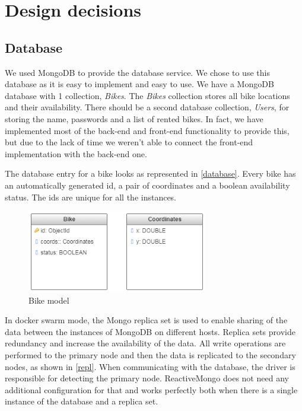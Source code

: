 \section{Design decisions}

\subsection{Database} \label{db_disc}
We used MongoDB to provide the database service. We chose to use this database as it is easy to implement and easy to use. We have a MongoDB database with 1 collection, \textit{Bikes}. The \textit{Bikes} collection stores all bike locations and their availability. There should be a second database collection, \textit{Users}, for storing the name, passwords and a list of rented bikes. In fact, we have implemented most of the back-end and front-end functionality to provide this, but due to the lack of time we weren't able to connect the front-end implementation with the back-end one.

The database entry for a bike looks as represented in \autoref{database}. Every bike has an automatically generated id, a pair of coordinates and a boolean availability status. The ids are unique for all the instances.

    \begin{figure}[H]
		\centering
		\includegraphics[width=0.7\textwidth]{images/db-structure.png}
		\caption{Bike model}
		\label{database}
	\end{figure}


In docker swarm mode, the Mongo replica set is used to enable sharing of the data between the instances of MongoDB on different hosts. Replica sets provide redundancy and increase the availability of the data. All write operations are performed to the primary node and then the data is replicated to the secondary nodes, as shown in \autoref{repl}. When communicating with the database, the driver is responsible for detecting the primary node. ReactiveMongo does not need any additional configuration for that and works perfectly both when there is a single instance of the database and a replica set.


